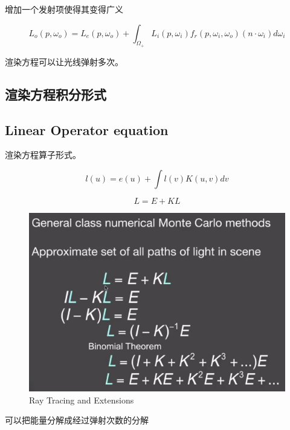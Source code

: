 增加一个发射项使得其变得广义

\begin{framed}
    \begin{equation}
        L_o(p,\omega_o)=L_e(p,\omega_o)+\int_{\Omega_+}L_{i}(p,\omega_i)f_r(p,\omega_i,\omega_o)(n\cdot \omega_i)d\omega_i
    \end{equation}
\end{framed}

渲染方程可以让光线弹射多次。

\subsection*{渲染方程积分形式}

\subsection*{Linear Operator equation}

渲染方程算子形式。

\begin{equation}
    l(u)=e(u)+\int l(v)K(u,v)dv
\end{equation}

\begin{equation}
    L=E+KL
\end{equation}

\begin{figure}[H]
    \centering
    \includegraphics[scale=0.5]{figures/Rendering.png}
    \caption{Ray Tracing and Extensions}
\end{figure}

可以把能量分解成经过弹射次数的分解

